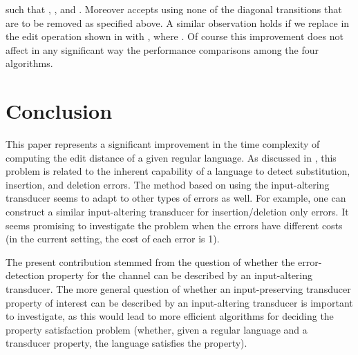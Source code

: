 \documentclass{article}
\theoremstyle{plain}
\theoremstyle{definition}
\theoremstyle{remark}
\begin{document}
such that , , and
. Moreover  accepts
 using none of the diagonal transitions that are
to be removed as specified above.
A similar observation holds if we replace in  the edit
operation  shown in  with ,
where .
Of course this improvement does not affect in any significant
way the performance comparisons among the four algorithms.


\section{Conclusion}\label{sec:last}
This paper represents a significant improvement in  the
time complexity of computing the edit distance of a given regular language.
As discussed in \cite{Kon:2007}, this problem is related to
the inherent capability of a language to detect substitution,
insertion, and deletion errors. The method based on using the input-altering transducer 
seems to adapt to other types of errors as well.
For example, one can construct a similar input-altering transducer for insertion/deletion only errors. It seems
promising to investigate the problem when the errors
have different costs (in the current setting, the cost of
each error is 1).

The present contribution stemmed from the
question of whether the error-detection property for
the channel   can be described by an
input-altering transducer. The more general question
of whether an input-preserving transducer property of
interest can be described by an input-altering transducer is important to investigate, as this would lead to more
efficient algorithms for deciding the property
satisfaction problem (whether, given a regular language
and a transducer property, the language satisfies the property).







\end{document}
